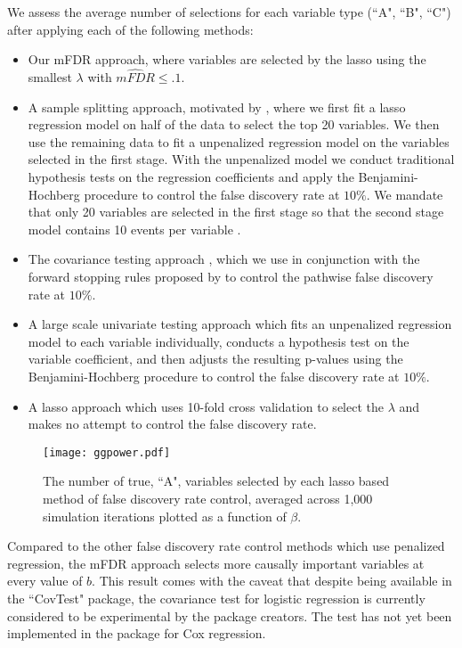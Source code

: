 We assess the average number of selections for each variable type (``A", ``B", ``C") after applying each of the following methods:
\begin{itemize}
\item Our mFDR approach, where variables are selected by the lasso using the smallest $\lambda$ with $\widehat{mFDR} \leq .1$.  
\item A sample splitting approach, motivated by \citet{Sample_Splitting}, where we first fit a lasso regression model on half of the data to select the top 20 variables. We then use the remaining data to fit a unpenalized regression model on the variables selected in the first stage. With the unpenalized model we conduct traditional hypothesis tests on the regression coefficients and apply the Benjamini-Hochberg procedure \citep{BH_1995} to control the false discovery rate at $10\%$. We mandate that only 20 variables are selected in the first stage so that the second stage model contains 10 events per variable \citep{peduzzi_epv}.
\item The covariance testing approach \citep{CovTest}, which we use in conjunction with the forward stopping rules proposed by \citet{GSell2016} to control the pathwise false discovery rate at $10\%$. 
\item A large scale univariate testing approach which fits an unpenalized regression model to each variable individually, conducts a hypothesis test on the variable coefficient, and then adjusts the resulting p-values using the Benjamini-Hochberg procedure to control the false discovery rate at $10\%$.
\item A lasso approach which uses 10-fold cross validation to select the $\lambda$ and makes no attempt to control the false discovery rate.
\end{itemize}

\begin{figure} [!htb]
 \centering
  \texttt{[image: ggpower.pdf]}
  \caption{\label{Fig:lassopower} The number of true, ``A", variables selected by each lasso based method of false discovery rate control, averaged across 1,000 simulation iterations plotted as a function of $\beta$.}
\end{figure}

Compared to the other false discovery rate control methods which use penalized regression, the mFDR approach selects more causally important variables at every value of $b$. This result comes with the caveat that despite being available in the ``CovTest" package, the covariance test for logistic regression is currently considered to be experimental by the package creators. The test has not yet been implemented in the package for Cox regression. 

